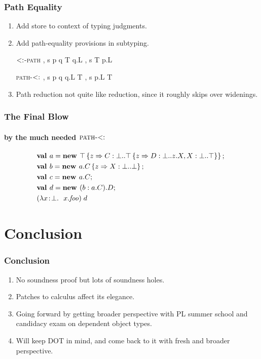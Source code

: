 \documentclass{beamer}
\begin{document}
\begin{frame}
\frametitle{Path Equality}
\begin{enumerate}
\item Add store to context of typing judgments.
\item Add path-equality provisions in subtyping.
\begin{block}{\textsc{$<:$-path}}
  \infrule
  {\Gamma, s \ts p \reduces q \spcomma T \sub q.L}
  {\Gamma, s \ts T \sub p.L}
\end{block}
\begin{block}{\textsc{path-$<:$}}
  \infrule
  {\Gamma, s \ts p \reduces q \spcomma q.L \sub T}
  {\Gamma, s \ts p.L \sub T}
\end{block}
\item Path reduction not quite like reduction, since it roughly skips
  over widenings.
\end{enumerate}
\end{frame}

\begin{frame}
\frametitle{The Final Blow}
\framesubtitle{by the much needed $\textsc{path-$<:$}$}
\begin{align*}
&\mlnew a {\Top \refine z {\Ldecl C \Bot {\Top \refine z {\Ldecl D \Bot {z.X}, \Ldecl X \Bot \Top}}}}{
\mlnew b {{a.C} \refine z {\Ldecl X \Bot \Bot}}}{
\mlnew c {a.C}}{
\mlnew d {(\wid b {a.C}).D}}{
\app {(\abs x \Bot {x.\mathit{foo}})} d
}
\end{align*}
\end{frame}

\section{Conclusion}
\begin{frame}
\frametitle{Conclusion}
\begin{enumerate}
\item No soundness proof but lots of soundness holes.
\item Patches to calculus affect its elegance.
\item Going forward by getting broader perspective with PL summer
  school and candidacy exam on dependent object types.
\item Will keep DOT in mind, and come back to it with fresh and broader perspective.
\end{enumerate}
\end{frame}
\end{document}
